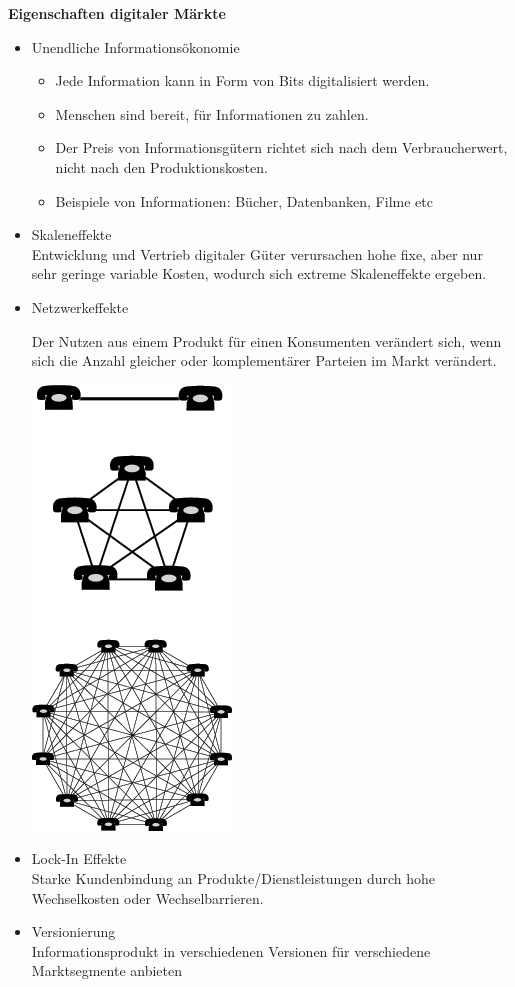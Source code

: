 \documentclass[a4]{scrartcl}
\begin{document}
\textbf{Eigenschaften digitaler Märkte} \\
\begin{itemize}
\item Unendliche Informationsökonomie
\begin{itemize}
\item Jede Information kann in Form von Bits digitalisiert werden.
\item Menschen sind bereit, für Informationen zu zahlen. 
\item Der Preis von Informationsgütern richtet sich nach dem Verbraucherwert, nicht nach den Produktionskosten.
\item Beispiele von Informationen: Bücher, Datenbanken, Filme etc
\end{itemize}
\item Skaleneffekte \\
Entwicklung und Vertrieb digitaler Güter verursachen hohe fixe, aber nur sehr geringe variable Kosten, wodurch sich extreme Skaleneffekte ergeben.
\item Netzwerkeffekte \\
\begin{minipage}[t]{0.8\textwidth}\vspace*{0cm}
Der Nutzen aus einem Produkt für einen Konsumenten verändert sich, wenn sich die Anzahl gleicher oder komplementärer Parteien im Markt verändert.
\end{minipage}
\begin{minipage}[t]{0.3\textwidth}\vspace*{0cm}
\includegraphics[scale=0.25]{network.png}
\end{minipage}
\item Lock-In Effekte \\
Starke Kundenbindung an Produkte/Dienstleistungen durch hohe Wechselkosten oder Wechselbarrieren.
\item Versionierung \\
Informationsprodukt in verschiedenen Versionen für verschiedene Marktsegmente anbieten

\end{itemize}
\end{document}
